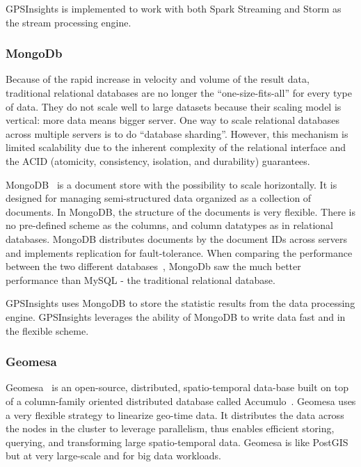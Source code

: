 \documentclass{acm_proc_article-sp}
\begin{document}
GPSInsights is implemented to work with both Spark Streaming and Storm as the stream processing engine.

\subsubsection{MongoDb}

Because of the rapid increase in velocity and volume of the result data, traditional relational databases are no longer the ``one-size-fits-all'' for every type of data. They do not scale well to large datasets because their scaling model is vertical: more data means bigger server. One way to scale relational databases across multiple servers is to do ``database sharding''. However, this mechanism is limited scalability due to the inherent complexity of the relational interface and the ACID (atomicity, consistency, isolation, and durability) guarantees. 

MongoDB~\cite{mongodbweb} is a document store with the possibility to scale horizontally. It is designed for managing semi-structured data organized as a collection of documents. In MongoDB, the structure of the documents is very flexible. There is no pre-defined scheme as the columns, and column datatypes as in relational databases. MongoDB distributes documents by the document IDs across servers and implements replication for fault-tolerance. When comparing the performance between the two different databases~\cite{Wu:Comparisons}, MongoDb saw the much better performance than MySQL - the traditional relational database.

GPSInsights uses MongoDB to store the statistic results from the data processing engine. GPSInsights leverages the ability of MongoDB to write data fast and in the flexible scheme. 

\subsubsection{Geomesa}
 
Geomesa~\cite{fox2013spatio} is an open-source, distributed, spatio-temporal data-base built on top of a column-family oriented distributed database called Accumulo~\cite{accumuloonline}. Geomesa uses a very flexible strategy to linearize geo-time data. It distributes the data across the nodes in the cluster to leverage parallelism, thus enables efficient storing, querying, and transforming large spatio-temporal data. Geomesa is like PostGIS~\cite{posgis} but at very large-scale and for big data workloads. 
\end{document}
